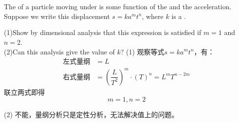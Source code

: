 \chapter[测量]{}
\begin{solution}[量纲分析]
    The  of a particle moving under  is some function of the  and
    the acceleration. Suppose we write this displacement
    $s=ka^mt^n$, where $k$ is a .

    \tcbrule

    (1)Show by
    dimensional analysis that this expression is satisfied if
    $m = 1$ and $n = 2$. \\
    (2)Can this analysis give the value of $k$?
    (1) 观察等式$s=ka^mt^n$，有：
    \begin{align*}
        \text{左式量纲} & =L                                        \\
        \text{右式量纲} & =(\dfrac{L}{T^2})^m\cdot(T)^n=L^mT^{n-2m}
    \end{align*}
    联立两式即得
    \[m=1,n=2\]
    \par
    (2) 不能，量纲分析只是定性分析，无法解决值上的问题。
\end{solution}